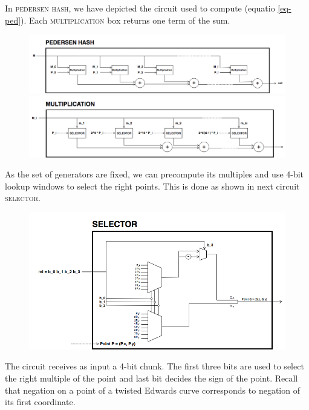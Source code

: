 In \textsc{pedersen hash}, we have depicted the circuit used to compute (equatio \ref{eq-ped}). Each \textsc{multiplication} box returns one term of the sum. 


\begin{figure}[h]
	\centering
	\includegraphics[scale=0.4]{Diag/Ped_Hash.png}
	\includegraphics[scale=0.4]{Diag/Ped_Hash_Multiplication.png}
\end{figure}

As the set of generators are fixed, we can precompute its multiples and use 4-bit lookup windows to select the right points. This is done as shown in next circuit \textsc{selector}.

\begin{figure}[h]
	\centering
	\includegraphics[scale=0.5]{Diag/Ped_Hash_Multiplication_selector.png}
\end{figure}

The circuit receives as input a 4-bit chunk. The first three bits are used to select the right multiple of the point and last bit decides the sign of the point. Recall that negation on a point of a twisted Edwards curve corresponds to negation of its first coordinate. 

%
%
%
%
%
%
%
